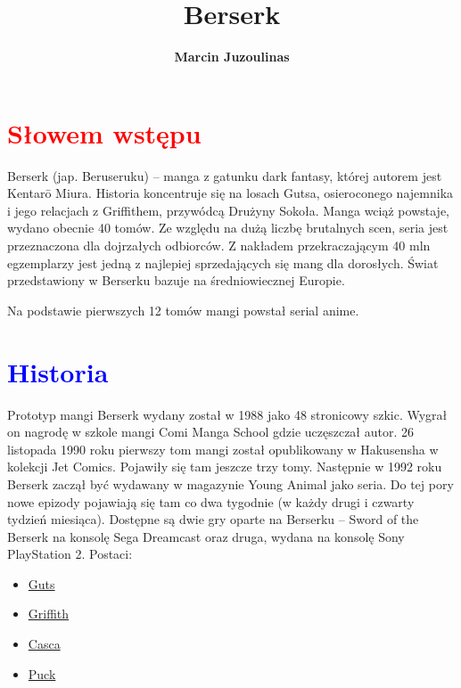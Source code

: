 \documentclass{article}
\title{\Huge{Berserk}}
\author{\textbf{Marcin Juzoulinas}}
\begin{document}
\maketitle
\newpage
\tableofcontents
\listoftables
\newpage
\section{\textcolor{red}{S\l{}owem wst\k{e}pu}}
\noindent
Berserk (jap. Beruseruku) – manga z gatunku dark fantasy, której autorem jest Kentarō Miura. Historia koncentruje się na losach Gutsa, osieroconego najemnika i jego relacjach z Griffithem, przywódcą Drużyny Sokoła. Manga wciąż powstaje, wydano obecnie 40 tomów. Ze względu na dużą liczbę brutalnych scen, seria jest przeznaczona dla dojrzałych odbiorców. Z nakładem przekraczającym 40 mln egzemplarzy jest jedną z najlepiej sprzedających się mang dla dorosłych. Świat przedstawiony w Berserku bazuje na średniowiecznej Europie.

Na podstawie pierwszych 12 tomów mangi powstał serial anime.
\newpage
\section{\textcolor{blue}{Historia}}
\noindent
Prototyp mangi Berserk wydany został w 1988 jako 48 stronicowy szkic. Wygrał on nagrodę w szkole mangi Comi Manga School gdzie uczęszczał autor. 26 listopada 1990 roku pierwszy tom mangi został opublikowany w Hakusensha w kolekcji Jet Comics. Pojawiły się tam jeszcze trzy tomy. Następnie w 1992 roku Berserk zaczął być wydawany w magazynie Young Animal jako seria. Do tej pory nowe epizody pojawiają się tam co dwa tygodnie (w każdy drugi i czwarty tydzień miesiąca).
\newline\newline
Dostępne są dwie gry oparte na Berserku – Sword of the Berserk na konsolę Sega Dreamcast oraz druga, wydana na konsolę Sony PlayStation 2.
\newline\newline
Postaci:
\begin{itemize}
\item
\href{https://berserk.fandom.com/wiki/Guts}{Guts}
\item
\href{https://berserk.fandom.com/wiki/Femto}{Griffith}
\item
\href{https://berserk.fandom.com/wiki/Casca}{Casca}
\item
\href{https://berserk.fandom.com/wiki/Puck}{Puck}
\end{itemize}
\end{document}
